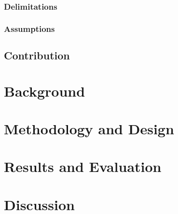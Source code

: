 \documentclass[12pt,a4paper]{report}
\begin{document}
\subsection{Delimitations}
\subsection{Assumptions}
\section{Contribution}

\chapter{Background}

\chapter{Methodology and Design}

\chapter{Results and Evaluation}

\chapter{Discussion}

\begin{thebibliography}{00}

\end{thebibliography}
\vspace{12pt}

\begin{appendices}

\end{appendices}
\end{document}
